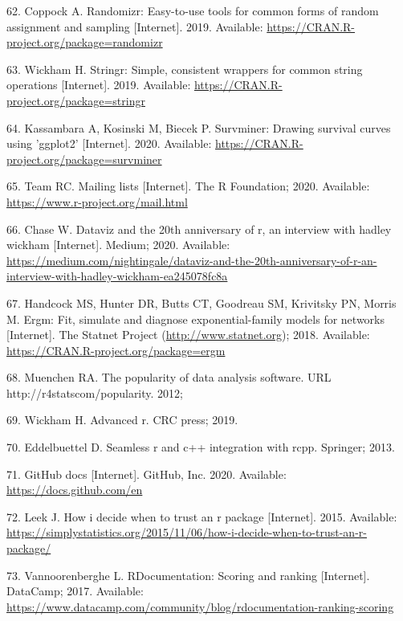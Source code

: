 \documentclass[10pt,letterpaper]{article}
\begin{document}
\leavevmode\hypertarget{ref-randomizr}{}%
62. Coppock A. Randomizr: Easy-to-use tools for common forms of random
assignment and sampling {[}Internet{]}. 2019. Available:
\url{https://CRAN.R-project.org/package=randomizr}

\leavevmode\hypertarget{ref-stringr}{}%
63. Wickham H. Stringr: Simple, consistent wrappers for common string
operations {[}Internet{]}. 2019. Available:
\url{https://CRAN.R-project.org/package=stringr}

\leavevmode\hypertarget{ref-survminer}{}%
64. Kassambara A, Kosinski M, Biecek P. Survminer: Drawing survival
curves using 'ggplot2' {[}Internet{]}. 2020. Available:
\url{https://CRAN.R-project.org/package=survminer}

\leavevmode\hypertarget{ref-Rmail2020}{}%
65. Team RC. Mailing lists {[}Internet{]}. The R Foundation; 2020.
Available: \url{https://www.r-project.org/mail.html}

\leavevmode\hypertarget{ref-chase2020}{}%
66. Chase W. Dataviz and the 20th anniversary of r, an interview with
hadley wickham {[}Internet{]}. Medium; 2020. Available:
\url{https://medium.com/nightingale/dataviz-and-the-20th-anniversary-of-r-an-interview-with-hadley-wickham-ea245078fc8a}

\leavevmode\hypertarget{ref-statnet}{}%
67. Handcock MS, Hunter DR, Butts CT, Goodreau SM, Krivitsky PN, Morris
M. Ergm: Fit, simulate and diagnose exponential-family models for
networks {[}Internet{]}. The Statnet Project
(\url{http://www.statnet.org}); 2018. Available:
\url{https://CRAN.R-project.org/package=ergm}

\leavevmode\hypertarget{ref-muenchen2012}{}%
68. Muenchen RA. The popularity of data analysis software. URL
http://r4statscom/popularity. 2012;

\leavevmode\hypertarget{ref-wickham2019}{}%
69. Wickham H. Advanced r. CRC press; 2019.

\leavevmode\hypertarget{ref-eddelbuettel2013}{}%
70. Eddelbuettel D. Seamless r and c++ integration with rcpp. Springer;
2013.

\leavevmode\hypertarget{ref-githubdocs}{}%
71. GitHub docs {[}Internet{]}. GitHub, Inc. 2020. Available:
\url{https://docs.github.com/en}

\leavevmode\hypertarget{ref-leek2015}{}%
72. Leek J. How i decide when to trust an r package {[}Internet{]}.
2015. Available:
\url{https://simplystatistics.org/2015/11/06/how-i-decide-when-to-trust-an-r-package/}

\leavevmode\hypertarget{ref-vannoorenberghe2017}{}%
73. Vannoorenberghe L. RDocumentation: Scoring and ranking
{[}Internet{]}. DataCamp; 2017. Available:
\url{https://www.datacamp.com/community/blog/rdocumentation-ranking-scoring}
\end{document}

